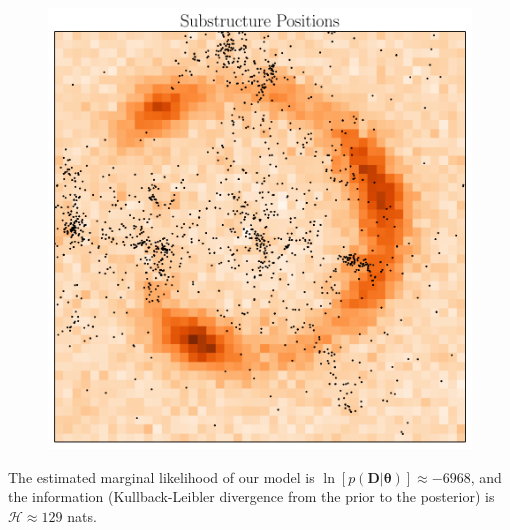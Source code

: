 \documentclass[useAMS,usenatbib]{mn2e}
\begin{document}
\begin{figure}
\begin{center}
\includegraphics[scale=0.4]{substructures2.pdf}
\caption{\label{fig:substructures2}}
\end{center}
\end{figure}

The estimated marginal likelihood of our model
is
$\ln\left[p(\boldsymbol{D} | \boldsymbol{\theta})\right] \approx -6968$, and
the information (Kullback-Leibler divergence from the prior to the posterior)
is $\mathcal{H} \approx 129$ nats.

\end{document}
